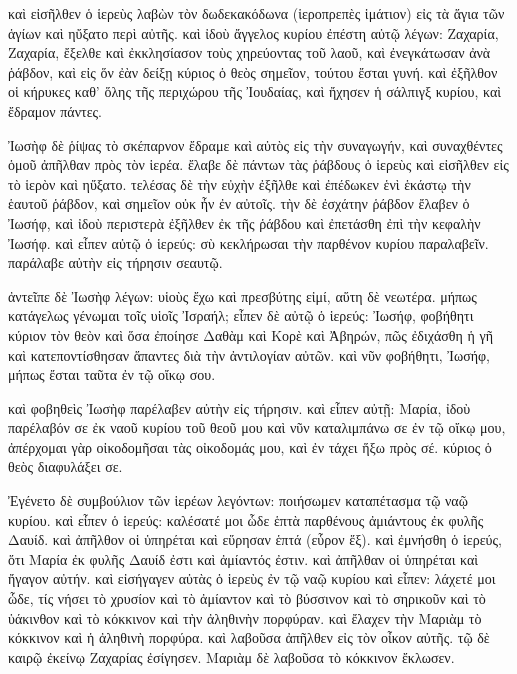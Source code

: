 \pend\pstart
καὶ εἰσῆλθεν ὁ ἱερεὺς λαβὼν τὸν δωδεκακόδωνα (ἱεροπρεπὲς ἱμάτιον) εἰς τὰ ἅγια τῶν ἁγίων καὶ ηὔξατο περὶ αὐτῆς. καὶ ἰδοὺ ἄγγελος κυρίου ἐπέστη αὐτῷ λέγων: Ζαχαρία, Ζαχαρία, ἔξελθε καὶ ἐκκλησίασον τοὺς χηρεύοντας τοῦ λαοῦ, καὶ ἐνεγκάτωσαν ἀνὰ ῥάβδον, καὶ εἰς ὅν ἐὰν δείξῃ κύριος ὁ θεὸς σημεῖον, τούτου ἔσται γυνή. καὶ ἐξῆλθον οἱ κήρυκες καθ' ὅλης τῆς περιχώρου τῆς Ἰουδαίας, καὶ ἤχησεν ἡ σάλπιγξ κυρίου, καὶ ἔδραμον πάντες.

\pend\pstart
{}

\pend\setcounter{pstartL}{1}\pstart
Ἰωσὴφ δὲ ῥίψας τὸ σκέπαρνον ἔδραμε καὶ αὐτὸς εἰς τὴν συναγωγήν, καὶ συναχθέντες ὁμοῦ ἀπῆλθαν πρὸς τὸν ἱερέα. ἔλαβε δὲ πάντων τὰς ῥάβδους ὁ ἱερεὺς καὶ εἰσῆλθεν εἰς τὸ ἱερὸν καὶ ηὔξατο. τελέσας δὲ τὴν εὐχὴν ἐξῆλθε καὶ ἐπέδωκεν ἑνὶ ἑκάστῳ τὴν ἑαυτοῦ ῥάβδον, καὶ σημεῖον οὐκ ἦν ἐν αὐτοῖς. τὴν δὲ ἐσχάτην ῥάβδον ἔλαβεν ὁ Ἰωσήφ, καὶ ἰδοὺ περιστερὰ ἐξῆλθεν ἐκ τῆς ῥάβδου καὶ ἐπετάσθη ἐπὶ τὴν κεφαλὴν Ἰωσήφ. καὶ εἶπεν αὐτῷ ὁ ἱερεύς: σὺ κεκλήρωσαι τὴν παρθένον κυρίου παραλαβεῖν. παράλαβε αὐτὴν εἰς τήρησιν σεαυτῷ.

\pend\pstart
ἀντεῖπε δὲ Ἰωσὴφ λέγων: υἱοὺς ἔχω καὶ πρεσβύτης εἰμί, αὕτη δὲ νεωτέρα. μήπως κατάγελως γένωμαι τοῖς υἱοῖς Ἰσραήλ; εἶπεν δὲ αὐτῷ ὁ ἱερεύς: Ἰωσήφ, φοβήθητι κύριον τὸν θεὸν καὶ ὅσα ἐποίησε Δαθὰμ καὶ Κορὲ καὶ Ἀβηρών, πῶς ἐδιχάσθη ἡ γῆ καὶ κατεποντίσθησαν ἅπαντες διὰ τὴν ἀντιλογίαν αὐτῶν. καὶ νῦν φοβήθητι, Ἰωσήφ, μήπως ἔσται ταῦτα ἐν τῷ οἴκῳ σου.

\pend\pstart
καὶ φοβηθεὶς Ἰωσὴφ παρέλαβεν αὐτὴν εἰς τήρησιν. καὶ εἶπεν αὐτῇ: Μαρία, ἰδοὺ παρέλαβόν σε ἐκ ναοῦ κυρίου τοῦ θεοῦ μου καὶ νῦν καταλιμπάνω σε ἐν τῷ οἴκῳ μου, ἀπέρχομαι γὰρ οἰκοδομῆσαι τὰς οἰκοδομάς μου, καὶ ἐν τάχει ἥξω πρὸς σέ. κύριος ὁ θεὸς διαφυλάξει σε.

\pend\pstart
{}

\pend\setcounter{pstartL}{1}\pstart
Ἐγένετο δὲ συμβούλιον τῶν ἱερέων λεγόντων: ποιήσωμεν καταπέτασμα τῷ ναῷ κυρίου. καὶ εἶπεν ὁ ἱερεύς: καλέσατέ μοι ὧδε ἑπτὰ παρθένους ἀμιάντους ἐκ φυλῆς Δαυίδ. καὶ ἀπῆλθον οἱ ὑπηρέται καὶ εὕρησαν ἑπτά (εὗρον ἕξ). καὶ ἐμνήσθη ὁ ἱερεύς, ὅτι Μαρία ἐκ φυλῆς Δαυίδ ἐστι καὶ ἀμίαντός ἐστιν. καὶ ἀπῆλθαν οἱ ὑπηρέται καὶ ἤγαγον αὐτήν. καὶ εἰσήγαγεν αὐτὰς ὁ ἱερεὺς ἐν τῷ ναῷ κυρίου καὶ εἶπεν: λάχετέ μοι ὧδε, τίς νήσει τὸ χρυσίον καὶ τὸ ἀμίαντον καὶ τὸ βύσσινον καὶ τὸ σηρικοῦν καὶ τὸ ὑάκινθον καὶ τὸ κόκκινον καὶ τὴν ἀληθινὴν πορφύραν. καὶ ἔλαχεν τὴν Μαριὰμ τὸ κόκκινον καὶ ἡ ἀληθινὴ πορφύρα. καὶ λαβοῦσα ἀπῆλθεν εἰς τὸν οἶκον αὐτῆς. τῷ δὲ καιρῷ ἐκείνῳ Ζαχαρίας ἐσίγησεν. Μαριὰμ δὲ λαβοῦσα τὸ κόκκινον ἔκλωσεν.

